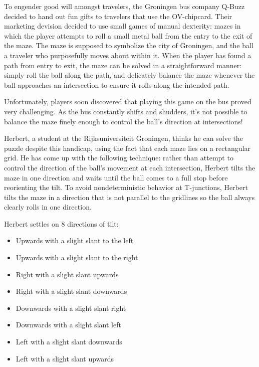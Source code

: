 


\def\mazename{Herbert}

{\StandaardZin}
To engender good will amongst travelers, the Groningen bus company Q-Buzz decided to hand out fun gifts to travelers that use the OV-chipcard.  Their marketing devision decided to use small games of manual dexterity: mazes in which the player attempts to roll a small metal ball from the entry to the exit of the maze. 
The maze is supposed to symbolize the city of Groningen, and the ball a traveler who purposefully moves about within it.
When the player has found a path from entry to exit, the maze can be solved in a straightforward manner: simply roll the ball along the path, and delicately balance the maze whenever the ball approaches an intersection to ensure it rolls along the intended path.

Unfortunately, players soon discovered that playing this game on the bus proved very challenging.  As the bus constantly shifts and shudders, it's not possible to balance the maze finely enough to control the ball's direction at intersections!

{\mazename}, a student at the Rijksuniversiteit Groningen, thinks he can solve the puzzle despite this handicap, using the fact that each maze lies on a rectangular grid.  He has come up with the following technique: rather than attempt to control the direction of the ball's movement at each intersection, {\mazename} tilts the maze in one direction and waits until the ball comes to a full stop before reorienting the tilt.  To avoid nondeterministic behavior at T-junctions, {\mazename} tilts the maze in a direction that is not parallel to the gridlines so the ball always clearly rolls in one direction.

{\mazename} settles on 8 directions of tilt:
\begin{itemize}
	\item Upwards with a slight slant to the left
	\item Upwards with a slight slant to the right
	\item Right with a slight slant upwards
	\item Right with a slight slant downwards
	\item Downwards with a slight slant right
	\item Downwards with a slight slant left
	\item Left with a slight slant downwards
	\item Left with a slight slant upwards
\end{itemize}

